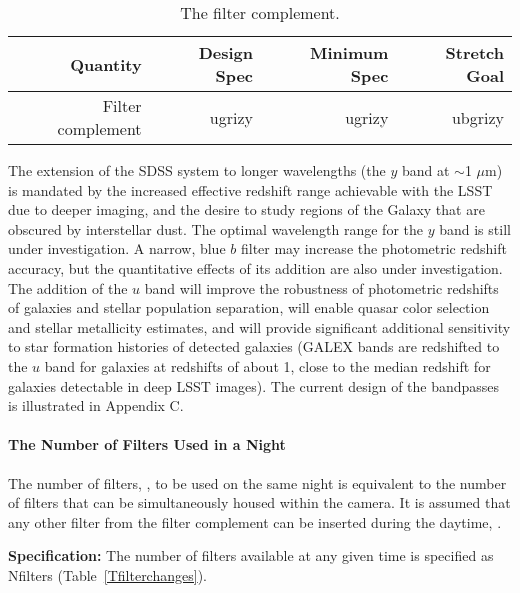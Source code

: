 \begin{table}[h!]
\begin{tabular}{|r|r|r|r|}
\hline
Quantity               & Design Spec & Minimum Spec & Stretch Goal      \\
\hline
 Filter complement     &   ugrizy      &   ugrizy       &   ubgrizy \\
\hline
\end{tabular}
\caption{The filter complement.}
\label{Tfilters}
\end{table}

\vskip -0.1in
The extension of the SDSS system to longer wavelengths (the $y$ band at
$\sim$1 $\mu$m) is
mandated by the increased effective redshift range achievable with the LSST
due to deeper imaging, and the desire to study regions of the Galaxy that
are obscured by interstellar dust.
The optimal wavelength range for the $y$ band is
still under investigation. A narrow, blue $b$ filter may increase the
photometric redshift accuracy, but the quantitative effects of its addition
are also under investigation. The addition of the $u$ band will improve the
robustness of photometric redshifts of galaxies and stellar population
separation, will enable quasar color selection and stellar metallicity
estimates, and will provide significant additional sensitivity to star
formation histories of detected galaxies (\eg GALEX bands are redshifted
to the $u$ band for galaxies at redshifts of about 1, close to the median
redshift for galaxies detectable in deep LSST images). The current design of
the bandpasses is illustrated in Appendix C.



\paragraph{\vskip -0.2in The Number of Filters Used in a Night\\}

The number of filters,
,
to be used on the same night is
equivalent to the number of filters that can be simultaneously housed
within the camera. It is assumed that any other filter from the filter
complement can be inserted during the daytime, .

{\bf Specification:} The number of filters available at any given time is
specified as Nfilters (Table~\ref{Tfilterchanges}).



